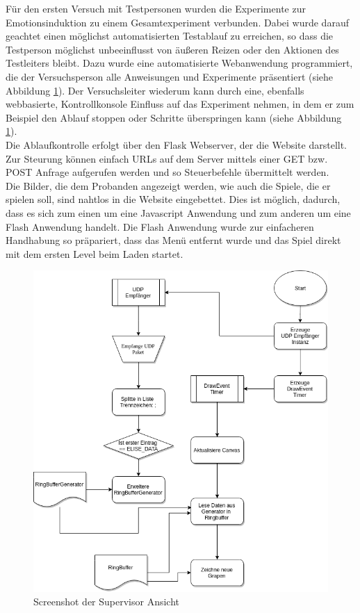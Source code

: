 

Für den ersten Versuch mit Testpersonen wurden die Experimente zur Emotionsinduktion zu einem Gesamtexperiment verbunden. Dabei wurde darauf geachtet einen möglichst automatisierten Testablauf zu erreichen, so dass die Testperson möglichst unbeeinflusst von äußeren Reizen oder den Aktionen des Testleiters bleibt. Dazu wurde eine automatisierte Webanwendung programmiert, die der Versuchsperson alle Anweisungen und Experimente präsentiert (siehe Abbildung \ref{fig:screen_soft1}). Der Versuchsleiter wiederum kann durch eine, ebenfalls webbasierte, Kontrollkonsole Einfluss auf das Experiment nehmen, in dem er zum Beispiel den Ablauf stoppen oder Schritte überspringen kann (siehe Abbildung \ref{fig:screen_soft1}).\\

Die Ablaufkontrolle erfolgt über den Flask Webserver, der die Website darstellt. Zur Steurung können einfach URLs auf dem Server mittels einer GET bzw. POST Anfrage aufgerufen werden und so Steuerbefehle übermittelt werden. \\

Die Bilder, die dem Probanden angezeigt werden, wie auch die Spiele, die er spielen soll, sind nahtlos in die Website eingebettet. Dies ist möglich, dadurch, dass es sich zum einen um eine Javascript Anwendung und zum anderen um eine Flash Anwendung handelt. Die Flash Anwendung wurde zur einfacheren Handhabung so präpariert, dass das Menü entfernt wurde und das Spiel direkt mit dem ersten Level beim Laden startet. \\

\begin{figure}[h]
    \centering
\begin{minipage}[t]{0.9\textwidth}
\includegraphics[width=\textwidth]{Images/ablauf_anzeige.png}
\end{minipage}
    \caption{Screenshot der Supervisor Ansicht}
    \label{fig:screen_soft1}
\end{figure}


